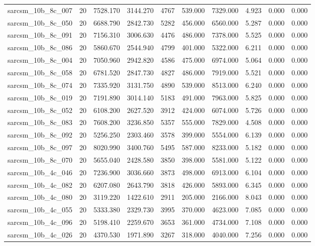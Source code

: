 \begin{tabular}{lrrrrrrrrr}
sarcsm\_10b\_8c\_007 & 20 & 7528.170 & 3144.270 & 4767 & 539.000 & 7329.000 & 4.923 & 0.000 & 0.000 \\
sarcsm\_10b\_8c\_050 & 20 & 6688.790 & 2842.730 & 5282 & 456.000 & 6560.000 & 5.287 & 0.000 & 0.000 \\
sarcsm\_10b\_8c\_091 & 20 & 7156.310 & 3006.630 & 4476 & 486.000 & 7378.000 & 5.525 & 0.000 & 0.000 \\
sarcsm\_10b\_8c\_086 & 20 & 5860.670 & 2544.940 & 4799 & 401.000 & 5322.000 & 6.211 & 0.000 & 0.000 \\
sarcsm\_10b\_8c\_004 & 20 & 7050.960 & 2942.820 & 4586 & 475.000 & 6974.000 & 5.064 & 0.000 & 0.000 \\
sarcsm\_10b\_8c\_058 & 20 & 6781.520 & 2847.730 & 4827 & 486.000 & 7919.000 & 5.521 & 0.000 & 0.000 \\
sarcsm\_10b\_8c\_074 & 20 & 7335.920 & 3131.750 & 4890 & 539.000 & 8513.000 & 6.240 & 0.000 & 0.000 \\
sarcsm\_10b\_8c\_019 & 20 & 7191.890 & 3014.140 & 5183 & 491.000 & 7963.000 & 5.825 & 0.000 & 0.000 \\
sarcsm\_10b\_8c\_052 & 20 & 6108.200 & 2627.520 & 3912 & 424.000 & 6074.000 & 5.726 & 0.000 & 0.000 \\
sarcsm\_10b\_8c\_083 & 20 & 7608.200 & 3236.850 & 5357 & 555.000 & 7829.000 & 4.508 & 0.000 & 0.000 \\
sarcsm\_10b\_8c\_092 & 20 & 5256.250 & 2303.460 & 3578 & 399.000 & 5554.000 & 6.139 & 0.000 & 0.000 \\
sarcsm\_10b\_8c\_097 & 20 & 8020.990 & 3400.760 & 5495 & 587.000 & 8233.000 & 5.182 & 0.000 & 0.000 \\
sarcsm\_10b\_8c\_070 & 20 & 5655.040 & 2428.580 & 3850 & 398.000 & 5581.000 & 5.122 & 0.000 & 0.000 \\
sarcsm\_10b\_4c\_046 & 20 & 7236.900 & 3036.660 & 3873 & 498.000 & 6913.000 & 6.104 & 0.000 & 0.000 \\
sarcsm\_10b\_4c\_082 & 20 & 6207.080 & 2643.790 & 3818 & 426.000 & 5893.000 & 6.345 & 0.000 & 0.000 \\
sarcsm\_10b\_4c\_080 & 20 & 3119.220 & 1422.610 & 2911 & 205.000 & 2166.000 & 8.043 & 0.000 & 0.000 \\
sarcsm\_10b\_4c\_055 & 20 & 5333.380 & 2329.730 & 3995 & 370.000 & 4623.000 & 7.085 & 0.000 & 0.000 \\
sarcsm\_10b\_4c\_096 & 20 & 5198.410 & 2259.670 & 3653 & 361.000 & 4734.000 & 7.108 & 0.000 & 0.000 \\
sarcsm\_10b\_4c\_026 & 20 & 4370.530 & 1971.890 & 3267 & 318.000 & 4040.000 & 7.256 & 0.000 & 0.000 \\

\end{tabular}
